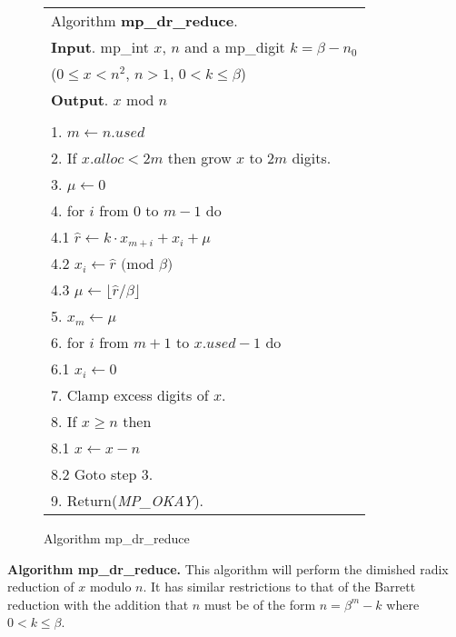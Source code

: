 \documentclass[b5paper]{book}
\begin{document}
\begin{figure}[!here]
\begin{small}
\begin{center}
\begin{tabular}{l}
\hline Algorithm \textbf{mp\_dr\_reduce}. \\
\textbf{Input}.   mp\_int $x$, $n$ and a mp\_digit $k = \beta - n_0$ \\
\hspace{11.5mm}($0 \le x < n^2$, $n > 1$, $0 < k \le \beta$) \\
\textbf{Output}.  $x \mbox{ mod } n$ \\
\hline \\
1.  $m \leftarrow n.used$ \\
2.  If $x.alloc < 2m$ then grow $x$ to $2m$ digits. \\
3.  $\mu \leftarrow 0$ \\
4.  for $i$ from $0$ to $m - 1$ do \\
\hspace{3mm}4.1  $\hat r \leftarrow k \cdot x_{m+i} + x_{i} + \mu$ \\
\hspace{3mm}4.2  $x_{i} \leftarrow \hat r \mbox{ (mod }\beta\mbox{)}$ \\
\hspace{3mm}4.3  $\mu \leftarrow \lfloor \hat r / \beta \rfloor$ \\
5.  $x_{m} \leftarrow \mu$ \\
6.  for $i$ from $m + 1$ to $x.used - 1$ do \\
\hspace{3mm}6.1  $x_{i} \leftarrow 0$ \\
7.  Clamp excess digits of $x$. \\
8.  If $x \ge n$ then \\
\hspace{3mm}8.1  $x \leftarrow x - n$ \\
\hspace{3mm}8.2  Goto step 3. \\
9.  Return(\textit{MP\_OKAY}). \\
\hline
\end{tabular}
\end{center}
\end{small}
\caption{Algorithm mp\_dr\_reduce}
\end{figure}

\textbf{Algorithm mp\_dr\_reduce.}
This algorithm will perform the dimished radix reduction of $x$ modulo $n$.  It has similar restrictions to that of the Barrett reduction
with the addition that $n$ must be of the form $n = \beta^m - k$ where $0 < k \le \beta$.  
\end{document}
